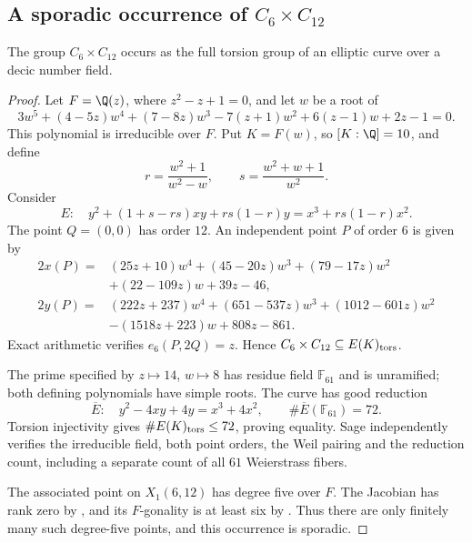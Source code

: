 \subsection{A sporadic occurrence of \texorpdfstring{$C_6\times C_{12}$}{C6 x C12}}
\begin{proposition}\label{prop:decic612}
The group $C_6\times C_{12}$ occurs as the full torsion group
of an elliptic curve over a decic number field.
\end{proposition}
\begin{proof}
Let $F=\Q(z)$, where $z^2-z+1=0$, and let $w$ be a root of
\[
 3w^5+(4-5z)w^4+(7-8z)w^3-7(z+1)w^2
       +6(z-1)w+2z-1=0.
\]
This polynomial is irreducible over $F$. Put $K=F(w)$, so
$[K:\Q]=10$, and define
\[
 r=\frac{w^2+1}{w^2-w},\qquad
 s=\frac{w^2+w+1}{w^2}.
\]
Consider
\[
 E:\quad y^2+(1+s-rs)xy+rs(1-r)y
       =x^3+rs(1-r)x^2.
\]
The point $Q=(0,0)$ has order $12$.
An independent point $P$ of order $6$ is given by
\[
\begin{aligned}
2x(P)={}&(25z+10)w^4+(45-20z)w^3+(79-17z)w^2\\
 &+(22-109z)w+39z-46,\\
2y(P)={}&(222z+237)w^4+(651-537z)w^3+(1012-601z)w^2\\
 &-(1518z+223)w+808z-861.
\end{aligned}
\]
Exact arithmetic verifies $e_6(P,2Q)=z$. Hence
$C_6\times C_{12}\subseteq E(K)_{\rm tors}$.

The prime specified by $z\mapsto14$, $w\mapsto8$ has residue
field $\mathbb F_{61}$ and is unramified; both defining
polynomials have simple roots. The curve has good reduction
\[
 \overline E:\quad y^2-4xy+4y=x^3+4x^2,
 \qquad \#\overline E(\mathbb F_{61})=72.
\]
Torsion injectivity gives $\#E(K)_{\rm tors}\le72$, proving equality.
Sage independently verifies the irreducible field, both point
orders, the Weil pairing and the reduction count, including a
separate count of all $61$ Weierstrass fibers.

The associated point on $X_1(6,12)$ has degree five over $F$.
The Jacobian has rank zero by \cite[Theorem~4.1]{DS}, and its
$F$-gonality is at least six by \cite[Table~1]{NV}.
Thus there are only finitely many such degree-five points,
and this occurrence is sporadic.
\end{proof}
